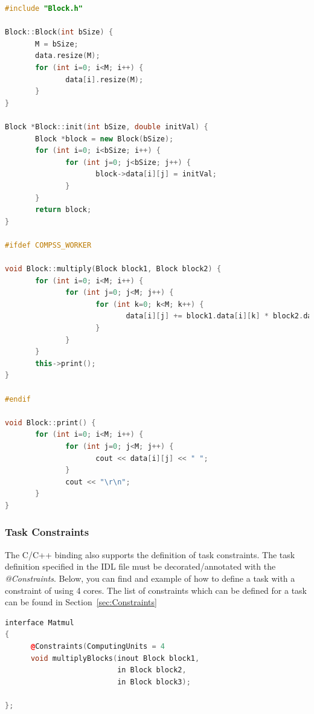 \begin{lstlisting}[language=C++]
#include "Block.h"

Block::Block(int bSize) {
       M = bSize;
       data.resize(M);
       for (int i=0; i<M; i++) {
              data[i].resize(M);
       }
}

Block *Block::init(int bSize, double initVal) {
       Block *block = new Block(bSize);
       for (int i=0; i<bSize; i++) {
              for (int j=0; j<bSize; j++) {
                     block->data[i][j] = initVal;
              }
       }
       return block;
}

#ifdef COMPSS_WORKER

void Block::multiply(Block block1, Block block2) {
       for (int i=0; i<M; i++) {
              for (int j=0; j<M; j++) {
                     for (int k=0; k<M; k++) {
                            data[i][j] += block1.data[i][k] * block2.data[k][j];
                     }
              }
       }
       this->print();
}

#endif

void Block::print() {
       for (int i=0; i<M; i++) {
              for (int j=0; j<M; j++) {
                     cout << data[i][j] << " ";
              }
              cout << "\r\n";
       }
}
\end{lstlisting}

\subsubsection{Task Constraints}
The C/C++ binding also supports the definition of task constraints. The task definition specified in the IDL file must be decorated/annotated with the \textit{@Constraints}. 
Below, you can find and example of how to define a task with a constraint of using 4 cores. The list of constraints which can be defined for a task can be found in Section~\ref{sec:Constraints}

\begin{lstlisting}[language=C++]
interface Matmul
{
      @Constraints(ComputingUnits = 4
      void multiplyBlocks(inout Block block1,
                          in Block block2,
                          in Block block3);
                          
};
\end{lstlisting}


